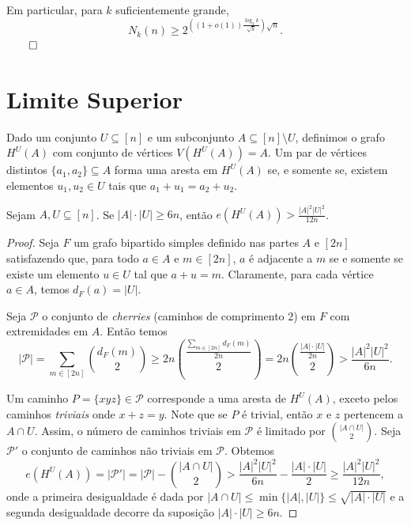 \documentclass[reqno,a4paper,12pt]{amsart}
\begin{document}
Em particular, para $k$ suficientemente grande,
\[
  \boxed{N_k(n) \geq 2^{\left((1+o(1))\frac{\log_2 k}{\sqrt{k}}\right)\sqrt{n}}}.
\] $\qed$

\section{Limite Superior}

Dado um conjunto $U \subseteq [n]$ e um subconjunto $A \subseteq [n] \setminus U$, definimos o grafo $H^U(A)$ com conjunto de vértices $V(H^U(A)) = A$. Um par de vértices distintos $\{a_1, a_2\} \subseteq A$ forma uma aresta em $H^U(A)$ se, e somente se, existem elementos $u_1, u_2 \in U$ tais que $a_1 + u_1 = a_2 + u_2$.

\vspace{1.5em}

\begin{lemma}
  \label{supersaturation1}
  Sejam $A, U \subseteq [n]$. Se $|A| \cdot |U| \geqslant 6n$, então $e(H^U(A)) > \frac{|A|^2|U|^2}{12n}$.
\end{lemma}

\begin{proof}
  Seja $F$ um grafo bipartido simples definido nas partes $A$ e $[2n]$ satisfazendo que, para todo $a \in A$ e $m \in [2n]$, $a$ é adjacente a $m$ se e somente se existe um elemento $u \in U$ tal que $a + u = m$. Claramente, para cada vértice $a \in A$, temos $d_F(a) = |U|$.

  Seja $\mathcal{P}$ o conjunto de \textit{cherries} (caminhos de comprimento 2) em $F$ com extremidades em $A$. Então temos
  $$ |\mathcal{P}| = \sum_{m \in [2n]} \binom{d_F(m)}{2} \geqslant 2n \binom{\frac{\sum_{m \in [2n]} d_F(m)}{2n}}{2} = 2n \binom{\frac{|A| \cdot |U|}{2n}}{2} > \frac{|A|^2|U|^2}{6n}. $$

  Um caminho $P = \{xyz\} \in \mathcal{P}$ corresponde a uma aresta de $H^U(A)$, exceto pelos caminhos \textit{triviais} onde $x + z = y$. Note que se $P$ é trivial, então $x$ e $z$ pertencem a $A \cap U$. Assim, o número de caminhos triviais em $\mathcal{P}$ é limitado por $\binom{|A \cap U|}{2}$. Seja $\mathcal{P}'$ o conjunto de caminhos não triviais em $\mathcal{P}$. Obtemos
  $$ e(H^U(A)) = |\mathcal{P}'| = |\mathcal{P}| - \binom{|A \cap U|}{2} > \frac{|A|^2|U|^2}{6n} - \frac{|A| \cdot |U|}{2} \geqslant \frac{|A|^2|U|^2}{12n}, $$
  onde a primeira desigualdade é dada por $|A \cap U| \leqslant \min\{|A|, |U|\} \leqslant \sqrt{|A| \cdot |U|}$ e a segunda desigualdade decorre da suposição $|A| \cdot |U| \geqslant 6n$.
\end{proof}
\end{document}

